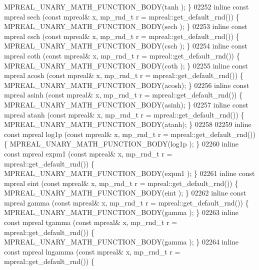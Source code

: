 \begin{DoxyCode}
{{      MPREAL\_UNARY\_MATH\_FUNCTION\_BODY(tanh );    \}
02252 \textcolor{keyword}{inline} \textcolor{keyword}{const} mpreal sech  (\textcolor{keyword}{const} mpreal& x, mp\_rnd\_t r = mpreal::get\_default\_rnd()) \{   
      MPREAL\_UNARY\_MATH\_FUNCTION\_BODY(sech );    \}
02253 \textcolor{keyword}{inline} \textcolor{keyword}{const} mpreal csch  (\textcolor{keyword}{const} mpreal& x, mp\_rnd\_t r = mpreal::get\_default\_rnd()) \{   
      MPREAL\_UNARY\_MATH\_FUNCTION\_BODY(csch );    \}
02254 \textcolor{keyword}{inline} \textcolor{keyword}{const} mpreal coth  (\textcolor{keyword}{const} mpreal& x, mp\_rnd\_t r = mpreal::get\_default\_rnd()) \{   
      MPREAL\_UNARY\_MATH\_FUNCTION\_BODY(coth );    \}
02255 \textcolor{keyword}{inline} \textcolor{keyword}{const} mpreal acosh (\textcolor{keyword}{const} mpreal& x, mp\_rnd\_t r = mpreal::get\_default\_rnd()) \{   
      MPREAL\_UNARY\_MATH\_FUNCTION\_BODY(acosh);    \}
02256 \textcolor{keyword}{inline} \textcolor{keyword}{const} mpreal asinh (\textcolor{keyword}{const} mpreal& x, mp\_rnd\_t r = mpreal::get\_default\_rnd()) \{   
      MPREAL\_UNARY\_MATH\_FUNCTION\_BODY(asinh);    \}
02257 \textcolor{keyword}{inline} \textcolor{keyword}{const} mpreal atanh (\textcolor{keyword}{const} mpreal& x, mp\_rnd\_t r = mpreal::get\_default\_rnd()) \{   
      MPREAL\_UNARY\_MATH\_FUNCTION\_BODY(atanh);    \}
02258 
02259 \textcolor{keyword}{inline} \textcolor{keyword}{const} mpreal log1p   (\textcolor{keyword}{const} mpreal& x, mp\_rnd\_t r = mpreal::get\_default\_rnd()) \{   
      MPREAL\_UNARY\_MATH\_FUNCTION\_BODY(log1p  );    \}
02260 \textcolor{keyword}{inline} \textcolor{keyword}{const} mpreal expm1   (\textcolor{keyword}{const} mpreal& x, mp\_rnd\_t r = mpreal::get\_default\_rnd()) \{   
      MPREAL\_UNARY\_MATH\_FUNCTION\_BODY(expm1  );    \}
02261 \textcolor{keyword}{inline} \textcolor{keyword}{const} mpreal eint    (\textcolor{keyword}{const} mpreal& x, mp\_rnd\_t r = mpreal::get\_default\_rnd()) \{   
      MPREAL\_UNARY\_MATH\_FUNCTION\_BODY(eint   );    \}
02262 \textcolor{keyword}{inline} \textcolor{keyword}{const} mpreal gamma   (\textcolor{keyword}{const} mpreal& x, mp\_rnd\_t r = mpreal::get\_default\_rnd()) \{   
      MPREAL\_UNARY\_MATH\_FUNCTION\_BODY(gamma  );    \}
02263 \textcolor{keyword}{inline} \textcolor{keyword}{const} mpreal tgamma  (\textcolor{keyword}{const} mpreal& x, mp\_rnd\_t r = mpreal::get\_default\_rnd()) \{   
      MPREAL\_UNARY\_MATH\_FUNCTION\_BODY(gamma  );    \}
02264 \textcolor{keyword}{inline} \textcolor{keyword}{const} mpreal lngamma (\textcolor{keyword}{const} mpreal& x, mp\_rnd\_t r = mpreal::get\_default\_rnd()) \{   
}}
\end{DoxyCode}
